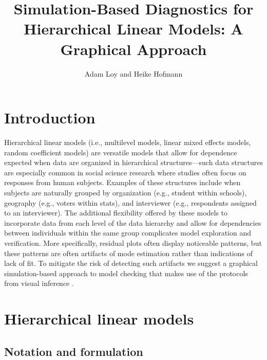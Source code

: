 \documentclass{article} %
\title{Simulation-Based Diagnostics for Hierarchical Linear Models: A Graphical Approach}
\author{Adam Loy and Heike Hofmann}
\begin{document}
\maketitle
\section{Introduction}

Hierarchical linear models (i.e., multilevel models, linear mixed effects models, random coefficient models) are versatile models that allow for dependence expected when data are organized in hierarchical structures---such data structures are especially common in social science research where studies often focus on responses from human subjects. Examples of these structures include when subjects are naturally grouped by organization (e.g., student within schools), geography (e.g., voters within stats), and interviewer (e.g., respondents assigned to an interviewer). The additional flexibility offered by these models to incorporate data from each level of the data hierarchy and allow for dependencies between individuals within the same group complicates model exploration and verification. More specifically, residual plots often display noticeable patterns, but these patterns are often artifacts of mode estimation rather than indications of lack of fit. To mitigate the risk of detecting such artifacts we suggest a graphical simulation-based approach to model checking that makes use of the protocols from visual inference \citep{Buja:2009hp}.


\section{Hierarchical linear models}\label{sec:hlms}

\subsection{Notation and formulation}
\end{document}
